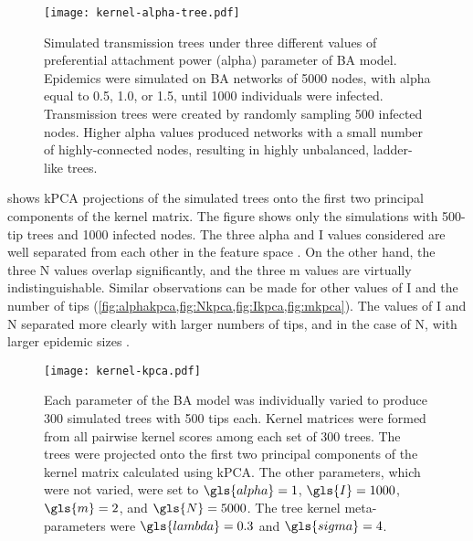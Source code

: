\begin{figure}[ht]
    \centering
    \texttt{[image: kernel-alpha-tree.pdf]}
    \caption[
        Simulated transmission trees under three different values of
        preferential attachment power (\gls{alpha}) parameter of \acrshort{BA}
        model.
    ]{
        Simulated transmission trees under three different values of
        preferential attachment power (\gls{alpha}) parameter of \acrshort{BA}
        model. Epidemics were simulated on \gls{BA} networks of 5000 nodes,
        with \gls{alpha} equal to 0.5, 1.0, or 1.5, until 1000 individuals were
        infected. Transmission trees were created by randomly sampling 500
        infected nodes. Higher \gls{alpha} values produced networks with a
        small number of highly-connected nodes, resulting in highly unbalanced,
        ladder-like trees.
    }
  \label{fig:alphatrees}
\end{figure}

 shows \gls{kPCA} projections of the simulated trees onto the
first two principal components of the kernel matrix. The figure shows only the
simulations with 500-tip trees and 1000 infected nodes. The three \gls{alpha}
and \gls{I} values considered are well separated from each other in the feature
space . On the other hand, the three \gls{N}
values overlap significantly, and the three \gls{m} values are virtually
indistinguishable. Similar observations can be made for other values of \gls{I}
and the number of tips (\cref{fig:alphakpca,fig:Nkpca,fig:Ikpca,fig:mkpca}).
The values of \gls{I} and \gls{N} separated more clearly with larger numbers of
tips, and in the case of \gls{N}, with larger epidemic sizes
.

\begin{figure}[ht]
    \centering
    \texttt{[image: kernel-kpca.pdf]}
    \caption[
        Kernel-\gls{PCA} projections of simulated trees under varying \gls{BA}
        parameter values.
    ]{
        Each parameter of the \gls{BA} model was individually varied to produce
        300 simulated trees with 500 tips each. Kernel matrices were formed
        from all pairwise kernel scores among each set of 300 trees. The trees
        were projected onto the first two principal components of the kernel
        matrix calculated using \gls{kPCA}. The other parameters, which were
        not varied, were set to $\gls{alpha} = 1$, $\gls{I} = 1000$, $\gls{m} =
        2$, and $\gls{N} = 5000$. The tree kernel meta-parameters were
        $\gls{lambda} = 0.3$ and $\gls{sigma} = 4$.
  }
  \label{fig:kpca}
\end{figure}



















